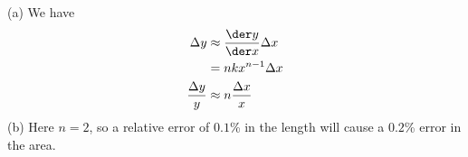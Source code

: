 (a) We have
\begin{align*}
  \Delta y & \approx \frac{\der y}{\der x} \Delta x \\
           &= nkx^{n-1} \Delta x \\
  \frac{\Delta y}{y} &\approx n\frac{\Delta x}{x}
\end{align*}
(b) Here $n=2$, so a relative error of $0.1$\% in
the length will cause a $0.2$\% error in the area.
